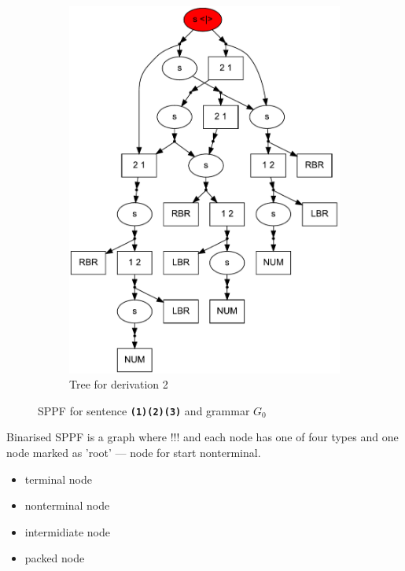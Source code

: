 \documentclass{sig-alternate} %
\begin{document}
\begin{figure}[ht]
\begin{center}
\begin{subfigure}[b]{0.3\textwidth}
        \includegraphics[width=\textwidth]{dot/Brackets.pdf}
        \caption{Tree for derivation 2}
        \label{tree2}        
    \end{subfigure}
    \caption{SPPF for sentence \textbf{\texttt{(1)(2)(3)}} and grammar $G_0$}
    \label{sppfSample}
    \end{center}                
\end{figure}

Binarised SPPF is a graph where !!! and each node has one of four types and one node marked as 'root' --- node for start nonterminal.

\begin{itemize}
    \item terminal node
    \item nonterminal node
    \item intermidiate node
    \item packed node
\end{itemize}
\end{document}

